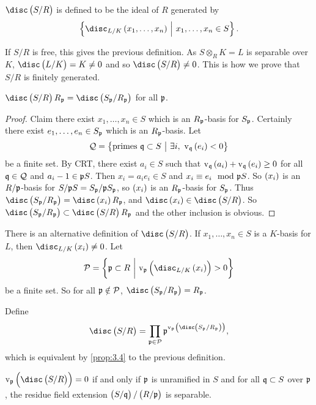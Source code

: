 \begin{definition*}
$ \disc\br{S / R} $ is defined to be the ideal of $ R $ generated by
$$ \cbr{\disc_{L / K} \br{x_1, \dots, x_n} \st x_1, \dots, x_n \in S}. $$
\end{definition*}

If $ S / R $ is free, this gives the previous definition. As $ S \otimes_R K = L $ is separable over $ K $, $ \disc\br{L / K} = K \ne 0 $ and so $ \disc\br{S / R} \ne 0 $. This is how we prove that $ S / R $ is finitely generated.

\begin{proposition}
\label{prop:3.4}
$ \disc\br{S / R}R_\ppp = \disc\br{S_\ppp / R_\ppp} $ for all $ \mathfrak{p} $.
\end{proposition}

\begin{proof}
Claim there exist $ x_1, \dots, x_n \in S $ which is an $ R_{\mathfrak{p}} $-basis for $ S_{\mathfrak{p}} $. Certainly there exist $ e_1, \dots, e_n \in S_{\mathfrak{p}} $ which is an $ R_{\mathfrak{p}} $-basis. Let
$$ \QQQ = \cbr{\text{primes} \ \qqq \subset S \st \exists i, \ \v_\qqq\br{e_i} < 0} $$
be a finite set. By CRT, there exist $ a_i \in S $ such that $ \v_\qqq\br{a_i} + \v_\qqq\br{e_i} \ge 0 $ for all $ \mathfrak{q} \in \mathcal{Q} $ and $ a_i - 1 \in \mathfrak{p} S $. Then $ x_i = a_ie_i \in S $ and $ x_i \equiv e_i \mod {\mathfrak{p}} S $. So $ \br{x_i} $ is an $ R / \mathfrak{p} $-basis for $ S / \mathfrak{p} S = S_{\mathfrak{p}} / \mathfrak{p} S_{\mathfrak{p}} $, so $ \br{x_i} $ is an $ R_{\mathfrak{p}} $-basis for $ S_{\mathfrak{p}} $. Thus $ \disc\br{S_\ppp / R_\ppp} = \disc \br{x_i}R_\ppp $, and $ \disc \br{x_i} \in \disc\br{S / R} $. So $ \disc \br{S_\ppp / R_\ppp} \subset \disc\br{S / R}R_\ppp $ and the other inclusion is obvious.
\end{proof}

There is an alternative definition of $ \disc\br{S / R} $. If $ x_1, \dots, x_n \in S $ is a $ K $-basis for $ L $, then $ \disc_{L / K} \br{x_i} \ne 0 $. Let
$$ \PPP = \cbr{\ppp \subset R \st \v_\ppp\br{\disc_{L / K} \br{x_i}} > 0} $$
be a finite set. So for all $ \mathfrak{p} \notin \mathcal{P} $, $ \disc\br{S_\ppp / R_\ppp} = R_\ppp $.

\begin{definition*}
Define
$$ \disc\br{S / R} = \prod_{\ppp \in \PPP} \ppp^{\v_\ppp\br{\disc\br{S_\ppp / R_\ppp}}}, $$
which is equivalent by \ref{prop:3.4} to the previous definition.
\end{definition*}

\begin{theorem}
\label{thm:3.5}
$ \v_\ppp\br{\disc\br{S / R}} = 0 $ if and only if $ \mathfrak{p} $ is unramified in $ S $ and for all $ \mathfrak{q} \subset S $ over $ \mathfrak{p} $, the residue field extension $ \br{S / \qqq} / \br{R / \ppp} $ is separable.
\end{theorem}

